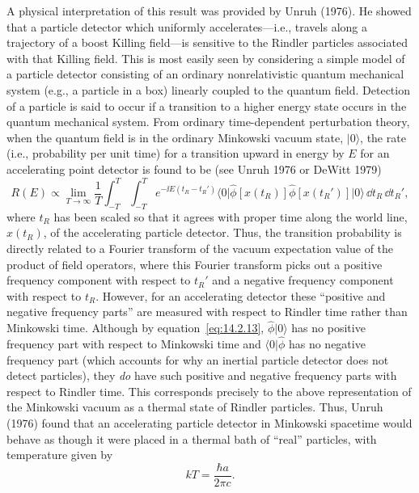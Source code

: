 A physical interpretation of this result was provided by Unruh (1976). He showed
that a particle detector which uniformly accelerates---i.e., travels along a trajectory
of a boost Killing field---is sensitive to the Rindler particles associated with that
Killing field. This is most easily seen by considering a simple model of a particle
detector consisting of an ordinary nonrelativistic quantum mechanical system (e.g.,
a particle in a box) linearly coupled to the quantum field. Detection of a particle is
said to occur if a transition to a higher energy state occurs in the quantum mechanical
system. From ordinary time-dependent perturbation theory, when the quantum field
is in the ordinary Minkowski vacuum state, \(\lvert0\rangle\), the rate (i.e.,
probability per unit time) for a transition upward in energy by \(E\) for an
accelerating point detector is found to be (see Unruh 1976 or DeWitt 1979)
\begin{equation}
  R(E)\propto\lim_{T\to\infty}\frac1T
  \int_{-T}^{T}\!\int_{-T}^{T}
  e^{-\ii E(t_R-t_R')}
  \langle0\rvert\widehat\phi[x(t_R)]\widehat\phi[x(t_R')]\lvert0\rangle
  \,\dd t_R\,\dd t_R',
  \tag{14.3.23}\label{eq:14.3.23}
\end{equation}
where \(t_R\) has been scaled so that it agrees with proper time along the world
line, \(x(t_R)\), of the accelerating particle detector. Thus, the transition probability
is directly related to a Fourier transform of the vacuum expectation value of the
product of field operators, where this Fourier transform picks out a positive
frequency component with respect to \(t_R'\) and a negative frequency component
with respect to \(t_R\). However, for an accelerating detector these ``positive and
negative frequency parts'' are measured with respect to Rindler time rather than
Minkowski time. Although by equation~\eqref{eq:14.2.13},
\(\widehat\phi\lvert0\rangle\) has no positive frequency part with respect to
Minkowski time and \(\langle0\rvert\widehat\phi\) has no negative frequency part
(which accounts for why an inertial particle detector does not detect particles), they
\emph{do} have such positive and negative frequency parts with respect to Rindler
time. This corresponds precisely to the above representation of the Minkowski
vacuum as a thermal state of Rindler particles. Thus, Unruh (1976) found that an
accelerating particle detector in Minkowski spacetime would behave as though it
were placed in a thermal bath of ``real'' particles, with temperature given by
\begin{equation}
  kT=\frac{\hbar a}{2\pi c}.
  \tag{14.3.24}\label{eq:14.3.24}
\end{equation}
